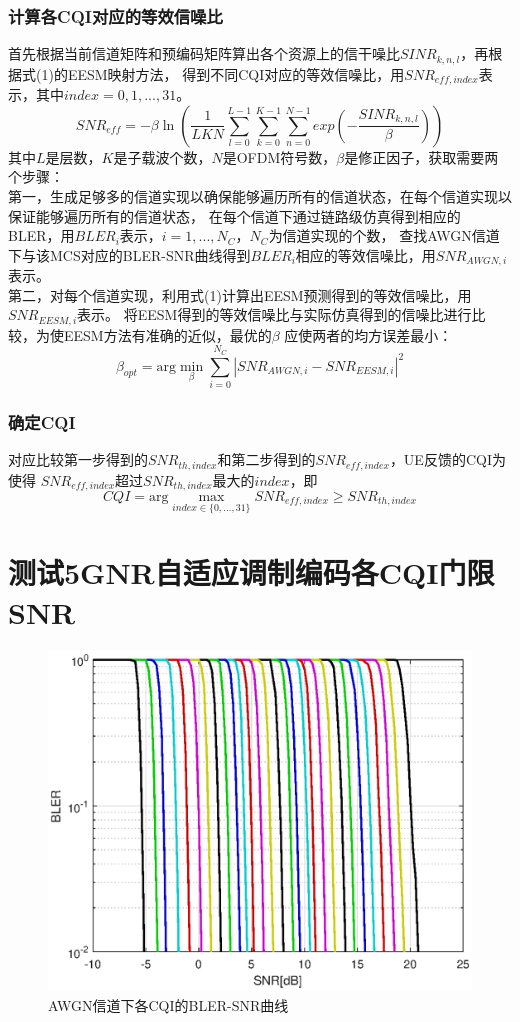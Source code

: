\documentclass{article}
\begin{document}
\subsubsection{计算各CQI对应的等效信噪比}
首先根据当前信道矩阵和预编码矩阵算出各个资源上的信干噪比$SINR_{k,n,l}$，再根据式(1)的EESM映射方法，
得到不同CQI对应的等效信噪比，用$SNR_{eff,index}$表示，其中$index=0,1,...,31$。
\begin{equation}
	SNR_{eff}=-\beta\ln(\frac{1}{LKN}\sum_{l=0}^{L-1}\sum_{k=0}^{K-1}\sum_{n=0}^{N-1}exp(-\frac{SINR_{k,n,l}}{\beta}))
\end{equation}
其中$L$是层数，$K$是子载波个数，$N$是OFDM符号数，$\beta$是修正因子，获取需要两个步骤：\\
第一，生成足够多的信道实现以确保能够遍历所有的信道状态，在每个信道实现以保证能够遍历所有的信道状态，
在每个信道下通过链路级仿真得到相应的BLER，用$BLER_i$表示，$i=1,...,N_C$，$N_C$为信道实现的个数，
查找AWGN信道下与该MCS对应的BLER-SNR曲线得到$BLER_i$相应的等效信噪比，用$SNR_{AWGN,i}$表示。\\
第二，对每个信道实现，利用式(1)计算出EESM预测得到的等效信噪比，用$SNR_{EESM,i}$表示。
将EESM得到的等效信噪比与实际仿真得到的信噪比进行比较，为使EESM方法有准确的近似，最优的$\beta$
应使两者的均方误差最小：
\begin{equation}
	\beta_{opt}=\mathrm{arg}\min_{\beta}{ \sum_{i=0}^{N_C}|{SNR_{AWGN,i}}-SNR_{EESM,i}|^2 }
\end{equation}
\subsubsection{确定CQI}
对应比较第一步得到的$SNR_{th,index}$和第二步得到的$SNR_{eff,index}$，UE反馈的CQI为使得
$SNR_{eff,index}$超过$SNR_{th,index}$最大的$index$，即
\begin{equation}
    CQI=\mathrm{arg}\max_{index\in\{0,...,31\}} SNR_{eff,index}\geq SNR_{th,index}
\end{equation}

\section{测试5GNR自适应调制编码各CQI门限SNR}
\begin{figure}[H]
	\centering
	\includegraphics[width = .8\textwidth]{bler.eps}
	\caption{AWGN信道下各CQI的BLER-SNR曲线}
\end{figure}
\end{document}
